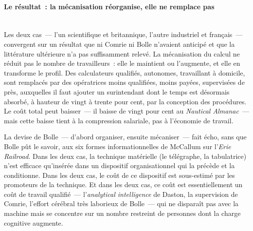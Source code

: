 \paragraph{Le résultat~: la mécanisation réorganise, elle ne remplace pas}\mbox{}\\
Les deux cas~--- l'un scientifique et britannique, l'autre industriel et français~--- convergent sur un résultat que ni Comrie ni Bolle n'avaient anticipé et que la littérature ultérieure n'a pas suffisamment relevé. La mécanisation du calcul ne réduit pas le nombre de travailleurs~: elle le maintient ou l'augmente, et elle en transforme le profil. Des calculateurs qualifiés, autonomes, travaillant à domicile, sont remplacés par des opératrices moins qualifiées, moins payées, supervisées de près, auxquelles il faut ajouter un surintendant dont le temps est désormais absorbé, à hauteur de vingt à trente pour cent, par la conception des procédures. Le coût total peut baisser~--- il baisse de vingt pour cent au \emph{Nautical Almanac}~--- mais cette baisse tient à la compression salariale, pas à l'économie de travail.

%
La devise de Bolle~--- \og d'abord organiser, ensuite mécaniser\fg{}~--- fait écho, sans que Bolle pût le savoir, aux six formes informationnelles de McCallum sur l'\emph{Erie Railroad}. Dans les deux cas, la technique matérielle (le télégraphe, la tabulatrice) n'est efficace qu'insérée dans un dispositif organisationnel qui la précède et la conditionne. Dans les deux cas, le coût de ce dispositif est sous-estimé par les promoteurs de la technique. Et dans les deux cas, ce coût est essentiellement un coût de travail qualifié~--- l'\emph{analytical intelligence} de Daston, la \og supervision\fg{} de Comrie, l'\og effort cérébral très laborieux\fg{} de Bolle~--- qui ne disparaît pas avec la machine mais se concentre sur un nombre restreint de personnes dont la charge cognitive augmente.


